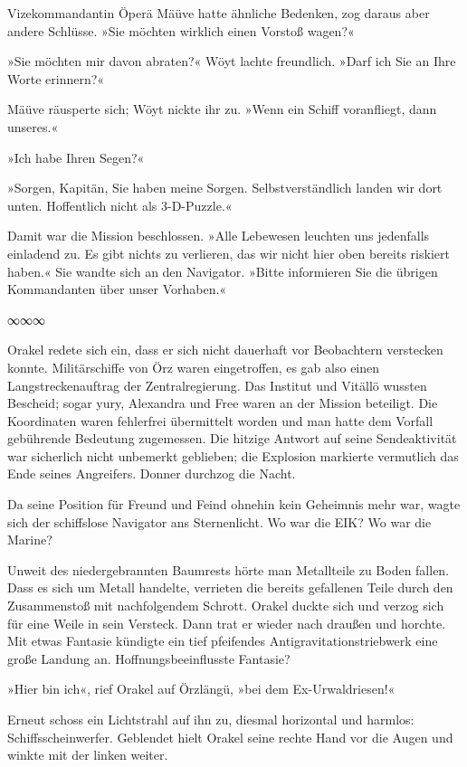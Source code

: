 Vizekommandantin Öperä Mäüve hatte ähnliche Bedenken, zog daraus aber andere Schlüsse. »Sie möchten wirklich einen Vorstoß wagen?«

»Sie möchten mir davon abraten?« Wöyt lachte freundlich. »Darf ich Sie an Ihre Worte erinnern?«

Mäüve räusperte sich; Wöyt nickte ihr zu. »Wenn ein Schiff voranfliegt, dann unseres.«

»Ich habe Ihren Segen?«

»Sorgen, Kapitän, Sie haben meine Sorgen. Selbstverständlich landen wir dort unten. Hoffentlich nicht als 3-D-Puzzle.«

Damit war die Mission beschlossen. »Alle Lebewesen leuchten uns jedenfalls einladend zu. Es gibt nichts zu verlieren, das wir nicht hier oben bereits riskiert haben.« Sie wandte sich an den Navigator.  »Bitte informieren Sie die übrigen Kommandanten über unser Vorhaben.«

\begin{center}
∞∞∞
\end{center}

Orakel redete sich ein, dass er sich nicht dauerhaft vor Beobachtern verstecken konnte. Militärschiffe von Örz waren eingetroffen, es gab also einen Langstreckenauftrag der Zentralregierung. Das Institut und Vitällö wussten Bescheid; sogar yury, Alexandra und Free waren an der Mission beteiligt. Die Koordinaten waren fehlerfrei übermittelt worden und man hatte dem Vorfall gebührende Bedeutung zugemessen. Die hitzige Antwort auf seine Sendeaktivität war sicherlich nicht unbemerkt geblieben; die Explosion markierte vermutlich das Ende seines Angreifers. Donner durchzog die Nacht.

Da seine Position für Freund und Feind ohnehin kein Geheimnis mehr war, wagte sich der schiffslose Navigator ans Sternenlicht. Wo war die EIK? Wo war die Marine?

Unweit des niedergebrannten Baumrests hörte man Metallteile zu Boden fallen. Dass es sich um Metall handelte, verrieten die bereits gefallenen Teile durch den Zusammenstoß mit nachfolgendem Schrott. Orakel duckte sich und verzog sich für eine Weile in sein Versteck. Dann trat er wieder nach draußen und horchte. Mit etwas Fantasie kündigte ein tief pfeifendes Antigravitationstriebwerk eine große Landung an. Hoffnungsbeeinflusste Fantasie?

»Hier bin ich«, rief Orakel auf Örzlängü, »bei dem Ex-Urwaldriesen!«

Erneut schoss ein Lichtstrahl auf ihn zu, diesmal horizontal und harmlos: Schiffsscheinwerfer. Geblendet hielt Orakel seine rechte Hand vor die Augen und winkte mit der linken weiter.

